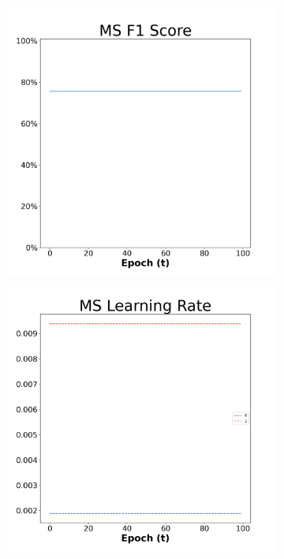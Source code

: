 \begin{figure}[H]
    \centering %
\begin{subfigure}{0.3\textwidth}
  \includegraphics[width=\linewidth]{images/exper2/NSP/MS_0.01_f1.png}
    \includegraphics[width=\linewidth]{images/exper2/NSP/MS_0.01_lr.png}

\end{subfigure}
\end{figure}
